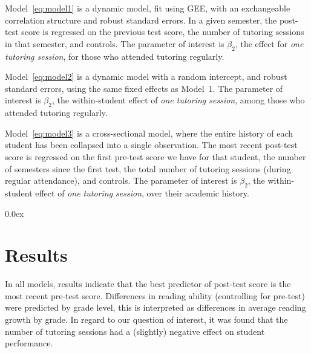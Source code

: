 \documentclass[a0,landscape]{a0poster}
\begin{document}
\begin{multicols}{3}
Model~\ref{eq:model1} is a dynamic model, fit using GEE,
with an exchangeable correlation structure and
robust standard errors.
In a given semester, the post-test score is regressed
on the previous test score,
the number of tutoring sessions in that semester,
and controls.
The parameter of interest is $\beta_2$, the
effect for \textit{one tutoring session},
for those who attended tutoring regularly.

Model~\ref{eq:model2} is a dynamic model with a random intercept,
and robust standard errors, using the same
fixed effects as Model~1.
The parameter of interest is $\beta_2$, the
within-student effect of \textit{one tutoring session},
among those who attended tutoring regularly.

Model~\ref{eq:model3} is a cross-sectional model, where the
entire history of each student has been collapsed into a
single observation.
The most recent post-test score is regressed on
the first pre-test score we have for that student,
the number of semesters since the first test,
the total number of tutoring sessions (during regular attendance),
and controls.
The parameter of interest is $\beta_2$, the
within-student effect of \textit{one tutoring session},
over their academic history.




\color{NavyBlue}
\parskip 0.0ex
\section*{Results}
%
\color{Black}
\begin{center}\vspace{1cm}

\end{center}\vspace{0.5cm}
\color{NavyBlue}
%   
In all models, results indicate that
the best predictor of post-test score is the most recent
pre-test score.
Differences in reading ability (controlling for pre-test)
were predicted by grade level, this is
interpreted as differences in average reading growth
by grade.
In regard to our question of interest, it was found that the
number of tutoring sessions
had a (slightly) negative effect on student performance. 


\end{multicols}
\end{document}
